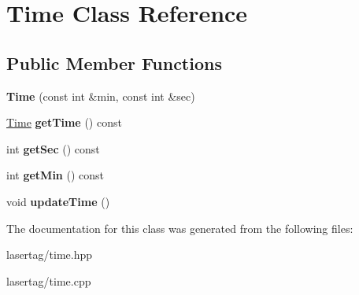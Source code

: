 \hypertarget{class_time}{}\section{Time Class Reference}
\label{class_time}
\subsection*{Public Member Functions}
\begin{DoxyCompactItemize}
\item 
\mbox{\label{class_time_aae2968f074ef2d14ef778891a22f39ee}} 
{\bfseries Time} (const int \&min, const int \&sec)
\item 
\mbox{\label{class_time_a93b57c132d115fc09e321072efee3cdc}} 
\mbox{\hyperlink{class_time}{Time}} {\bfseries get\+Time} () const
\item 
\mbox{\label{class_time_afbc705df6c52b481418b559237a69a55}} 
int {\bfseries get\+Sec} () const
\item 
\mbox{\label{class_time_a8cd37cf10b562d7f6efb418e7e0aa90a}} 
int {\bfseries get\+Min} () const
\item 
\mbox{\label{class_time_a6ca53f2e34d612ffb44e94b35186614b}} 
void {\bfseries update\+Time} ()
\end{DoxyCompactItemize}


The documentation for this class was generated from the following files\+:\begin{DoxyCompactItemize}
\item 
lasertag/time.\+hpp\item 
lasertag/time.\+cpp\end{DoxyCompactItemize}
